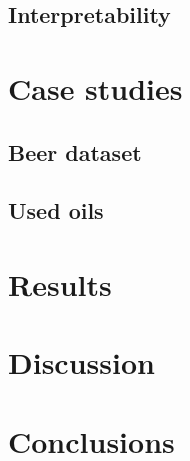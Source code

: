 \documentclass{article}
\begin{document}
	\subsection{Interpretability}
	
	
	\section{Case studies}
	
	\subsection{Beer dataset}
	
	\subsection{Used oils}
	
	
	\section{Results}
	
	\section{Discussion}
	
	
	\section{Conclusions}
	
\end{document}
